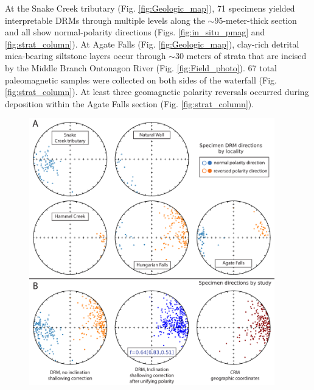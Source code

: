 \documentclass[draft]{agujournal2019}
\begin{document}
At the Snake Creek tributary (Fig. \ref{fig:Geologic_map}), 71 specimens yielded interpretable DRMs through multiple levels along the $\sim$95-meter-thick section and all show normal-polarity directions (Figs. \ref{fig:in_situ_pmag} and \ref{fig:strat_column}). At Agate Falls (Fig. \ref{fig:Geologic_map}), clay-rich detrital mica-bearing siltstone layers occur through $\sim$30 meters of strata that are incised by the Middle Branch Ontonagon River (Fig. \ref{fig:Field_photo}). 67 total paleomagnetic samples were collected on both sides of the waterfall (Fig. \ref{fig:strat_column}). At least three geomagnetic polarity reversals occurred during deposition within the Agate Falls section (Fig. \ref{fig:strat_column}). 

\begin{figure}[h!]
\centering
\includegraphics[width=0.95\textwidth]{in_situ_pmag.pdf}

\end{figure}
\end{document}
